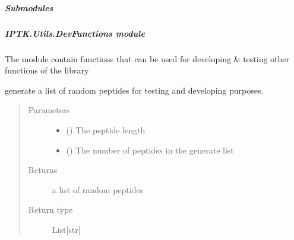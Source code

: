 \documentclass[letterpaper,10pt,english]{sphinxmanual}
\begin{document}
\subparagraph{Submodules}
\label{\detokenize{IPTK.Utils:submodules}}

\subparagraph{IPTK.Utils.DevFunctions module}
\label{\detokenize{IPTK.Utils:module-IPTK.Utils.DevFunctions}}\label{\detokenize{IPTK.Utils:iptk-utils-devfunctions-module}}
The module contain functions that can be used for developing \& testing other functions of the library

\begin{fulllineitems}
\label{\detokenize{IPTK.Utils:IPTK.Utils.DevFunctions.generate_random_peptide_seq}}
generate a list of random peptides for testing and developing purposes.
\begin{quote}\begin{description}
\item[{Parameters}] \leavevmode\begin{itemize}
\item {} 
 () \textendash{} The peptide length

\item {} 
 () \textendash{} The number of peptides in the generate list

\end{itemize}

\item[{Returns}] \leavevmode
a list of random peptides

\item[{Return type}] \leavevmode
List{[}str{]}

\end{description}\end{quote}

\end{fulllineitems}
\end{document}
